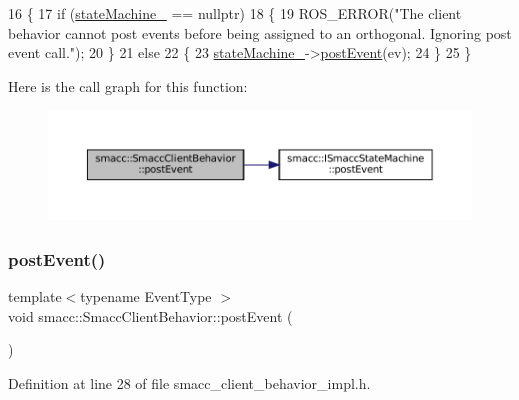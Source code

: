 \begin{DoxyCode}
16 \{
17     \textcolor{keywordflow}{if} (\hyperlink{classsmacc_1_1SmaccClientBehavior_a7950b5684d6de0a8e8959c0936ce9a19}{stateMachine\_} == \textcolor{keyword}{nullptr})
18     \{
19         ROS\_ERROR(\textcolor{stringliteral}{"The client behavior cannot post events before being assigned to an orthogonal. Ignoring
       post event call."});
20     \}
21     \textcolor{keywordflow}{else}
22     \{
23         \hyperlink{classsmacc_1_1SmaccClientBehavior_a7950b5684d6de0a8e8959c0936ce9a19}{stateMachine\_}->\hyperlink{classsmacc_1_1ISmaccStateMachine_ad80cdd7bbc9a9f3b221c625754fed1ed}{postEvent}(ev);
24     \}
25 \}
\end{DoxyCode}
Here is the call graph for this function\+:
\nopagebreak
\begin{figure}[H]
\begin{center}
\leavevmode
\includegraphics[width=350pt]{classsmacc_1_1SmaccClientBehavior_ab29b23145ea074ad69340fc0af6fbb75_cgraph}
\end{center}
\end{figure}
\mbox{\label{classsmacc_1_1SmaccClientBehavior_a3152cd2215ebc0e387a8a546de07cded}} 
\subsubsection{\texorpdfstring{post\+Event()}{postEvent()}\hspace{0.1cm}{\footnotesize\ttfamily [2/2]}}
{\footnotesize\ttfamily template$<$typename Event\+Type $>$ \\
void smacc\+::\+Smacc\+Client\+Behavior\+::post\+Event (\begin{DoxyParamCaption}{ }\end{DoxyParamCaption})}



Definition at line 28 of file smacc\+\_\+client\+\_\+behavior\+\_\+impl.\+h.



